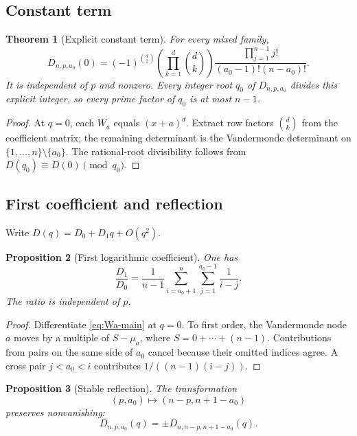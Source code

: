 \documentclass[11pt]{amsart}
\newcommand{\1}{\mathbf 1}
\newtheorem{theorem}{Theorem}[section]
\newtheorem{proposition}[theorem]{Proposition}
\theoremstyle{remark}
\begin{document}
\subsection{Constant term}
\begin{theorem}[Explicit constant term]\label{thm:D0-main}
For every mixed family,
\begin{equation}\label{eq:D0-main}
 D_{n,p,a_0}(0)=(-1)^{\binom d2}
 \left(\prod_{k=1}^d\binom dk\right)
 \frac{\prod_{j=1}^{n-1}j!}{(a_0-1)!(n-a_0)!}.
\end{equation}
It is independent of $p$ and nonzero. Every integer root $q_0$ of $D_{n,p,a_0}$ divides this explicit integer, so every prime factor of $q_0$ is at most $n-1$.
\end{theorem}

\begin{proof}
At $q=0$, each $W_a$ equals $(x+a)^d$. Extract row factors $\binom dk$ from the coefficient matrix; the remaining determinant is the Vandermonde determinant on $\{1,\ldots,n\}\setminus\{a_0\}$. The rational-root divisibility follows from $D(q_0)\equiv D(0)\pmod{q_0}$.
\end{proof}

\subsection{First coefficient and reflection}
Write $D(q)=D_0+D_1q+O(q^2)$.

\begin{proposition}[First logarithmic coefficient]\label{prop:D1-main}
One has
\begin{equation}\label{eq:D1-main}
 \frac{D_1}{D_0}=\frac1{n-1}
 \sum_{i=a_0+1}^{n}\sum_{j=1}^{a_0-1}\frac1{i-j}.
\end{equation}
The ratio is independent of $p$.
\end{proposition}

\begin{proof}
Differentiate \eqref{eq:Wa-main} at $q=0$. To first order, the Vandermonde node $a$ moves by a multiple of $S-\mu_a$, where $S=0+\cdots+(n-1)$. Contributions from pairs on the same side of $a_0$ cancel because their omitted indices agree. A cross pair $j<a_0<i$ contributes $1/((n-1)(i-j))$.
\end{proof}

\begin{proposition}[Stable reflection]\label{prop:D-reflection-main}
The transformation
\[
 (p,a_0)\longmapsto(n-p,n+1-a_0)
\]
preserves nonvanishing:
\[
 D_{n,p,a_0}(q)=\pm D_{n,n-p,n+1-a_0}(q).
\]
\end{proposition}
\end{document}
